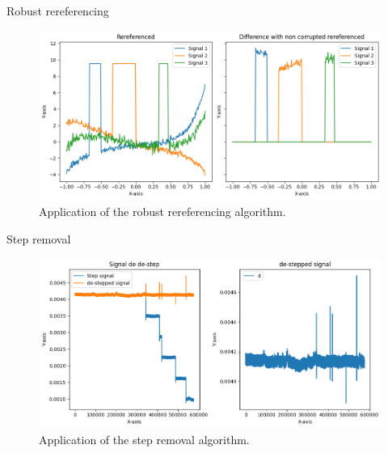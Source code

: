 \documentclass[10pt,serif]{beamer}
\begin{document}
\begin{frame}{Robust rereferencing}

    \begin{figure}
        \centering
        \includegraphics[width=.8\textwidth]{figures/rereferencing.png}
        \caption{Application of the robust rereferencing algorithm.}
        \label{fig:data}
    \end{figure}

\end{frame}

\begin{frame}{Step removal}

    \begin{figure}
        \centering
        \includegraphics[width=.8\textwidth]{figures/step_removal_real.png}
        \caption{Application of the step removal algorithm.}
        \label{fig:data}
    \end{figure}
\end{frame}
\end{document}
